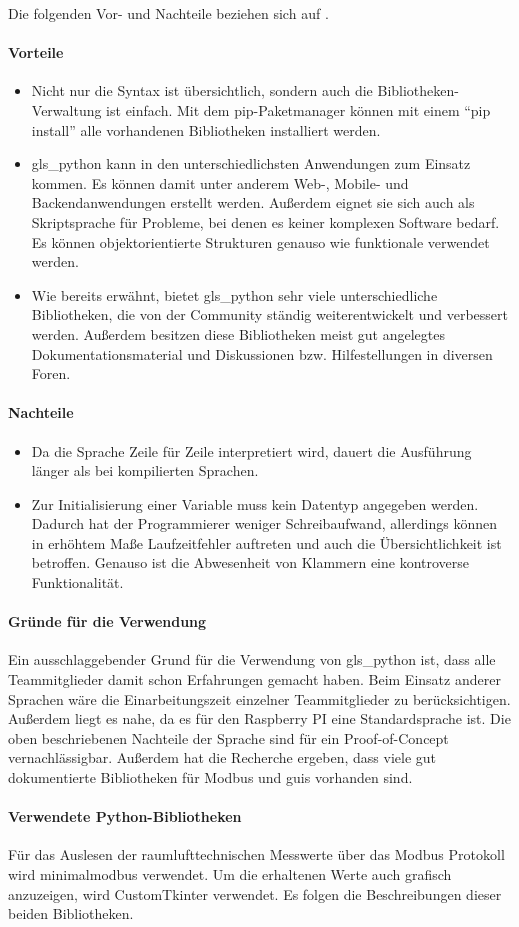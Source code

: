 Die folgenden Vor- und Nachteile beziehen sich auf \textcite{Ceaseo:2020}.
\paragraph{Vorteile}
\begin{itemize}
	\item Nicht nur die Syntax ist übersichtlich, sondern auch die Bibliotheken-Verwaltung ist einfach. Mit dem pip-Paketmanager können mit einem \enquote{pip install} alle vorhandenen Bibliotheken installiert werden.
	\item \gls{gls_python} kann in den unterschiedlichsten Anwendungen zum Einsatz kommen. Es können damit unter anderem Web-, Mobile- und Backendanwendungen erstellt werden. Außerdem eignet sie sich auch als Skriptsprache für Probleme, bei denen es keiner komplexen Software bedarf. Es können objektorientierte Strukturen genauso wie funktionale verwendet werden. 
	\item Wie bereits erwähnt, bietet \gls{gls_python} sehr viele unterschiedliche Bibliotheken, die von der Community ständig weiterentwickelt und verbessert werden. Außerdem besitzen diese Bibliotheken meist gut angelegtes Dokumentationsmaterial und Diskussionen bzw. Hilfestellungen in diversen Foren.
\end{itemize}

\paragraph{Nachteile}
\begin{itemize}{}{}
	\item Da die Sprache Zeile für Zeile interpretiert wird, dauert die Ausführung länger als bei kompilierten Sprachen.
	\item Zur Initialisierung einer Variable muss kein Datentyp angegeben werden. Dadurch hat der Programmierer weniger Schreibaufwand, allerdings können in erhöhtem Maße Laufzeitfehler auftreten und auch die Übersichtlichkeit ist betroffen. Genauso ist die Abwesenheit von Klammern eine kontroverse Funktionalität.
\end{itemize}

\paragraph{Gründe für die Verwendung}
Ein ausschlaggebender Grund für die Verwendung von \gls{gls_python} ist, dass alle Teammitglieder damit schon Erfahrungen gemacht haben. Beim Einsatz anderer Sprachen wäre die Einarbeitungszeit einzelner Teammitglieder zu berücksichtigen. Außerdem liegt es nahe, da es für den Raspberry PI eine Standardsprache ist. Die oben beschriebenen Nachteile der Sprache sind für ein Proof-of-Concept vernachlässigbar. Außerdem hat die Recherche ergeben, dass viele gut dokumentierte Bibliotheken für Modbus und \aclp{gui} vorhanden sind.

\paragraph{Verwendete Python-Bibliotheken}
Für das Auslesen der raumlufttechnischen Messwerte über das Modbus Protokoll wird minimalmodbus verwendet. Um die erhaltenen Werte auch grafisch anzuzeigen, wird CustomTkinter verwendet. Es folgen die Beschreibungen dieser beiden Bibliotheken.

